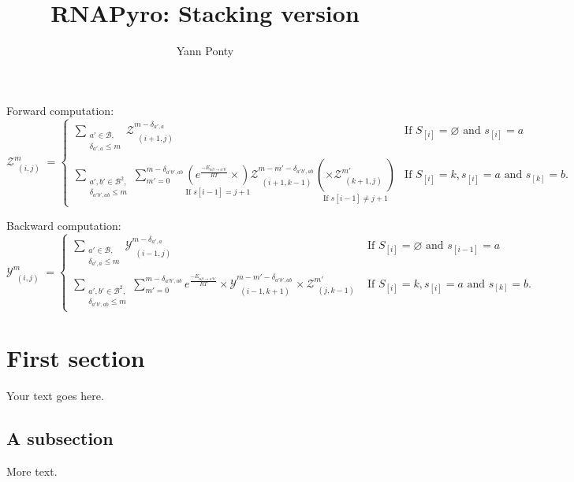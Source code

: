 \documentclass[11pt]{article} %
\title{RNAPyro: Stacking version}
\author{Yann Ponty}
\begin{document}
\maketitle
\newcommand{\Z}[3]{\mathcal{Z}_{\substack{(#1)\\ [#3]}}^{#2}}
\newcommand{\Y}[3]{\mathcal{Y}_{\substack{(#1)\\ [#3]}}^{#2}}
\newcommand{\B}{\mathcal{B}}
\newcommand{\Kron}{\delta}
\newcommand{\ub}{\bullet}


Forward computation:
\begin{equation}
  \Z{i,j}{m}{\alpha,\beta} = \left\{
  \begin{array}{ll}
    \displaystyle
    \sum_{\substack{a'\in \B,\\ \Kron_{a',a}\le m}}  
      \Z{i+1,j}{m-\Kron_{a',a}}{a',\beta} & \text{If }S_{[i]}=\varnothing\text{ and }s_{[i]}=a\\
    \displaystyle
    \sum_{\substack{a',b'\in \B^2,\\ \Kron_{a'b',ab}\le m}}  
    \sum_{m'=0}^{m-\Kron_{a'b',ab}}      \underset{\text{If }s[i-1]=j+1}{\left(e^{\frac{-E_{\alpha \beta \to a' b'}}{RT}}\times\right)} \Z{i+1,k-1}{m-m'-\Kron_{a'b',ab}}{a',b'}\underset{\text{If }s[i-1]\neq j+1}{\left(\times\Z{k+1,j}{m'}{b',\beta}\right)} & \text{If }S_{[i]}=k, s_{[i]}=a\text{ and }s_{[k]}=b.
  \end{array}
\right.
\end{equation}

Backward computation:
\begin{equation}
  \Y{i,j}{m}{\alpha,\beta} = \left\{
  \begin{array}{ll}
    \displaystyle
    \sum_{\substack{a'\in \B,\\ \Kron_{a',a}\le m}}  
      \Y{i-1,j}{m-\Kron_{a',a}}{a',\beta} & \text{If }S_{[i]}=\varnothing\text{ and }s_{[i-1]}=a\\
    \displaystyle
    \sum_{\substack{a',b'\in \B^2,\\ \Kron_{a'b',ab}\le m}}  
    \sum_{m'=0}^{m-\Kron_{a'b',ab}}      
      e^{\frac{-E_{\alpha \beta \to a' b'}}{RT}}
      \times \Y{i-1,k+1}{m-m'-\Kron_{a'b',ab}}{a',b'}
      \times\Z{j,k-1}{m'}{\beta,b'}
    & \text{If }S_{[i]}=k, s_{[i]}=a\text{ and }s_{[k]}=b.
  \end{array}
\right.
\end{equation}

\section{First section}

Your text goes here.

\subsection{A subsection}

More text.
\end{document}

